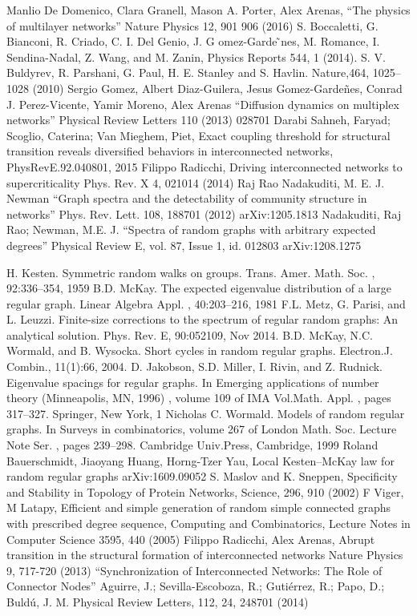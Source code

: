 \documentclass[aps,12pt]{revtex4}
\begin{document}
\begin{thebibliography}{99}
Manlio De Domenico, Clara Granell, Mason A. Porter, Alex Arenas,
"`The physics of multilayer networks"'
Nature Physics 12, 901 906 (2016)
S.  Boccaletti,  G.  Bianconi,  R.  Criado,  C.  I.  Del  Genio, J. G omez-Garde ̃nes, M. Romance, I. Sendina-Nadal, Z. Wang, and M. Zanin, Physics Reports
544, 1 (2014).
 S. V. Buldyrev, R. Parshani, G. Paul, H. E. Stanley and
S. Havlin.
Nature,464, 1025–1028 (2010)
Sergio Gomez, Albert Diaz-Guilera, Jesus Gomez-Gardeñes, Conrad J. Perez-Vicente, Yamir Moreno, Alex Arenas
"`Diffusion dynamics on multiplex networks"'
Physical Review Letters 110 (2013) 028701
	Darabi Sahneh, Faryad; Scoglio, Caterina; Van Mieghem, Piet,
	Exact coupling threshold for structural transition reveals diversified behaviors in interconnected networks,
PhysRevE.92.040801, 2015	
Filippo Radicchi,
Driving interconnected networks to supercriticality
Phys. Rev. X 4, 021014 (2014)
Raj Rao Nadakuditi, M. E. J. Newman
"`Graph spectra and the detectability of community structure in networks"'
Phys. Rev. Lett. 108, 188701 (2012)
 arXiv:1205.1813
 Nadakuditi, Raj Rao; Newman, M.E. J.
"`Spectra of random graphs with arbitrary expected degrees"'
Physical Review E, vol. 87, Issue 1, id. 012803
arXiv:1208.1275

H. Kesten. Symmetric random walks on groups.
Trans. Amer. Math. Soc.
, 92:336–354, 1959
B.D. McKay. The expected eigenvalue distribution of a large regular graph.
Linear Algebra Appl.
, 40:203–216, 1981
 F.L. Metz, G. Parisi, and L. Leuzzi. Finite-size corrections to the spectrum of regular random
graphs: An analytical solution.
Phys. Rev. E, 90:052109, Nov 2014.
B.D. McKay, N.C. Wormald, and B. Wysocka. Short cycles in random regular graphs.
Electron.J. Combin., 11(1):66, 2004.
D. Jakobson, S.D. Miller, I. Rivin, and Z. Rudnick. Eigenvalue spacings for regular graphs.
In Emerging applications of number theory (Minneapolis, MN, 1996)
, volume 109 of IMA Vol.Math. Appl.
, pages 317–327. Springer, New York, 1
Nicholas C. Wormald. Models of random regular graphs. In
Surveys in combinatorics, volume 267 of London Math. Soc. Lecture Note Ser.
, pages 239–298. Cambridge Univ.Press, Cambridge, 1999
Roland Bauerschmidt, Jiaoyang Huang, Horng-Tzer Yau,
Local Kesten--McKay law for random regular graphs
arXiv:1609.09052
S.  Maslov  and  K.  Sneppen,  Specificity  and  Stability  in
Topology of Protein Networks, Science,
296, 910 (2002)
  F  Viger,  M  Latapy,  Efficient  and  simple  generation  of
random simple connected graphs with prescribed degree
sequence, Computing and Combinatorics, Lecture Notes
in Computer Science
3595, 440 (2005)
Filippo Radicchi, Alex Arenas,
Abrupt transition in the structural formation of interconnected networks
Nature Physics 9, 717-720 (2013)
"`Synchronization of Interconnected Networks: The Role of Connector Nodes"'
    Aguirre, J.; Sevilla-Escoboza, R.; Gutiérrez, R.; Papo, D.; Buldú, J. M.
    Physical Review Letters, 112, 24, 248701 (2014)


\end{thebibliography}
\end{document}

